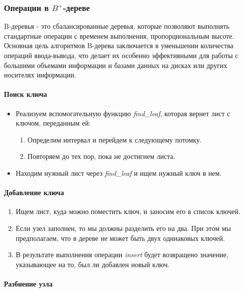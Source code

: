 \documentclass[14pt, russian]{scrartcl}
\begin{document}
\subsubsection{Операции в $B^+$-дереве}

B-деревья - это сбалансированные деревья, которые позволяют выполнять стандартные операции с временем выполнения, пропорциональным высоте. Основная цель алгоритмов B-дерева заключается в уменьшении количества операций ввода-вывода, что делает их особенно эффективными для работы с большими объемами информации и базами данных на дисках или других носителях информации.

\paragraph{Поиск ключа}

\begin{itemize}
\item Реализуем вспомогательную функцию \textit{find\_leaf}, которая вернет лист с ключом, переданным ей:
    \begin{enumerate}
    \item Определим интервал и перейдем к следующему потомку.
    \item Повторяем до тех пор, пока не достигнем листа.
    \end{enumerate}
\item Находим нужный лист через \textit{find\_leaf} и ищем нужный ключ в нем.
\end{itemize}

\paragraph{Добавление ключа}

\begin{enumerate}
\item Ищем лист, куда можно поместить ключ, и заносим его в список ключей.
\item Если узел заполнен, то мы должны разделить его на два. При этом мы предполагаем, что в дереве не может быть двух одинаковых ключей.
\item В результате выполнения операции \textit{insert} будет возвращено значение, указывающее на то, был ли добавлен новый ключ.
\end{enumerate}

\paragraph{Разбиение узла}
\end{document}
